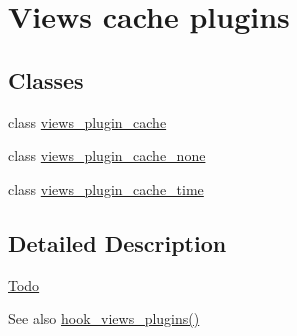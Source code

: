 \hypertarget{group__views__cache__plugins}{
\section{Views cache plugins}
\label{group__views__cache__plugins}
}
\subsection*{Classes}
\begin{DoxyCompactItemize}
\item 
class \hyperlink{classviews__plugin__cache}{views\_\-plugin\_\-cache}
\item 
class \hyperlink{classviews__plugin__cache__none}{views\_\-plugin\_\-cache\_\-none}
\item 
class \hyperlink{classviews__plugin__cache__time}{views\_\-plugin\_\-cache\_\-time}
\end{DoxyCompactItemize}


\subsection{Detailed Description}
\begin{Desc}
\item[\hyperlink{todo__todo000055}{Todo}]\end{Desc}
\begin{DoxySeeAlso}{See also}
\hyperlink{group__views__hooks_ga23f6e9972b2ed84fc54b7ff63f44477d}{hook\_\-views\_\-plugins()} 
\end{DoxySeeAlso}

